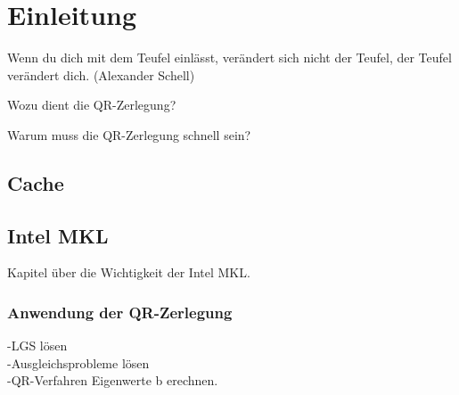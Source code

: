 \chapter{Einleitung}

Wenn du dich mit dem Teufel einlässt, verändert sich nicht der Teufel, der Teufel verändert dich. (Alexander Schell)


Wozu dient die QR-Zerlegung?


Warum muss die QR-Zerlegung schnell sein?

\section{Cache}

\section{Intel MKL}

Kapitel über die Wichtigkeit der Intel MKL.

\subsection{Anwendung der QR-Zerlegung}
-LGS lösen\\
-Ausgleichsprobleme lösen \\
-QR-Verfahren Eigenwerte b  erechnen.